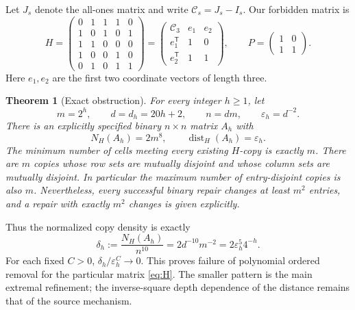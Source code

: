 \documentclass[11pt]{article}
\newtheorem{theorem}{Theorem}[section]
\theoremstyle{definition}
\newcommand{\eps}{\varepsilon}
\newcommand{\dist}{\operatorname{dist}}
\newcommand{\crown}{\mathcal C}
\begin{document}
Let \(J_s\) denote the all-ones matrix and write \(\crown_s=J_s-I_s\).
Our forbidden matrix is
\begin{equation}
 H=\begin{pmatrix}
 0&1&1&1&0\\
 1&0&1&0&1\\
 1&1&0&0&0\\
 1&0&0&1&0\\
 0&1&0&1&1
 \end{pmatrix}
 =\begin{pmatrix}
 \crown_3&e_1&e_2\\ e_1^{\mathsf T}&1&0\\
 e_2^{\mathsf T}&1&1
 \end{pmatrix},
 \qquad P=\begin{pmatrix}1&0\\1&1\end{pmatrix}.
 \label{eq:H}
\end{equation}
Here \(e_1,e_2\) are the first two coordinate vectors of length three.

\begin{theorem}[Exact obstruction]
\label{thm:main}
For every integer \(h\ge1\), let
\[
 m=2^h,\qquad d=d_h=20h+2,\qquad n=dm,\qquad \eps_h=d^{-2}.
\]
There is an explicitly specified binary \(n\times n\) matrix \(A_h\) with
\begin{equation}
 N_H(A_h)=2m^8,\qquad
 \dist_H(A_h)=\eps_h.
 \label{eq:exact-main}
\end{equation}
The minimum number of cells meeting every existing \(H\)-copy is exactly
\(m\). There are \(m\) copies whose row sets are mutually disjoint and
whose column sets are mutually disjoint. In particular the maximum number
of entry-disjoint copies is also \(m\). Nevertheless, every successful
binary repair changes at least \(m^2\) entries, and a repair with exactly
\(m^2\) changes is given explicitly.
\end{theorem}

Thus the normalized copy density is exactly
\begin{equation}
 \delta_h:=\frac{N_H(A_h)}{n^{10}}
 =2d^{-10}m^{-2}=2\eps_h^5 4^{-h}.
 \label{eq:delta}
\end{equation}
For each fixed \(C>0\), \(\delta_h/\eps_h^C\to0\). This proves
failure of polynomial ordered removal for the particular matrix \eqref{eq:H}.
The smaller pattern is the main extremal refinement; the inverse-square
depth dependence of the distance remains that of the source mechanism.
\end{document}
